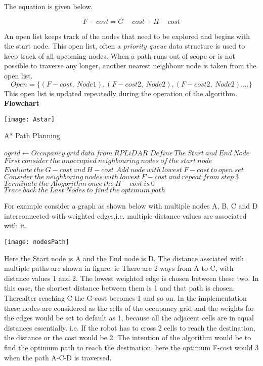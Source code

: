 The equation is given below.

\[F-cost = G-cost + H-cost\]

An open list keeps track of the nodes that need to be explored and begins with the start node. This open list, often a \emph{priority queue} data structure is used to keep track of all upcoming nodes. When a path runs out of scope or is not possible to traverse any longer, another nearest neighbour node is taken from the open list.
\[Open = \{(F-cost, \ Node1),(F-cost2, \ Node2), (F-cost2, \ Node2) .... \} \]
This open list is updated repeatedly during the operation of the algorithm.
\newpage
\textbf{Flowchart}\\ 
\begin{center}
    \texttt{[image: Astar]}     
\end{center}

\vspace{2cm}
\begin{algorithm}[hbt!]
    \caption{A* Path Planning }\label{alg:cap}
    
    \begin{algorithmic}[1]
    
        \Require $ogrid \gets Occupancy\ grid\ data\ from\ RPLiDAR$
        \State $Define\ The\ Start\ and\ End\ Node$
        \State $First\ consider\ the\ unoccupied\ neighbouring\ nodes\ of\ the\ start\ node$
        \State $Evaluate\  the\ G-cost\ and\ H-cost$
        \State $Add\ node\ with\ lowest\ F-cost\ to\ open\ set$
        \State $Consider\ the\ neighboring\ nodes\ with\ lowest\ F-cost\ and\ repeat\ from\ step\ 3$
        \State $Terminate\ the\ Alogorithm\ once\ the\ H-cost\ is\ 0$
        \State $Trace\ back\ the\ Last\ Nodes\ to\ find\ the\ optimum\ path$
        
    \end{algorithmic}
\end{algorithm}

\newpage
For example consider a graph as shown below with multiple nodes A, B, C and D interconnected with weighted edges,i.e. multiple distance values are associated with it.
\begin{center}
    \texttt{[image: nodesPath]}     
\end{center}

Here the Start node is A and the End node is D. The distance assciated with multiple paths are shown in figure. ie There are 2 ways from A to C, with distance values 1 and 2. The lowest weighted edge is chosen between these two. In this case, the shortest distance between them is 1 and that path is chosen. Thereafter reaching C the G-cost becomes 1 and so on. In the implementation these nodes are considered as the cells of the occupancy grid and the weights for the edges would be set to default as 1, because all the adjacent cells are in equal distances essentially. i.e. If the robot has to cross 2 cells to reach the destination, the distance or the cost would be 2. The intention of the algorithm would be to find the optimum path to reach the destination, here the optimum F-cost would 3 when the path A-C-D is traversed.

